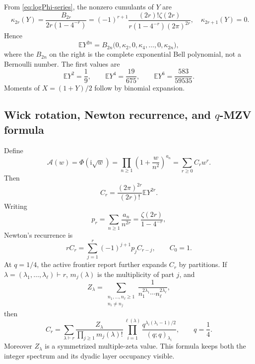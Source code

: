 \documentclass[11pt,oneside]{article}
\theoremstyle{definition}
\theoremstyle{remark}
\newcommand{\E}{\mathbb E}
\newcommand{\ii}{\mathrm i}
\newcommand{\Acal}{\mathcal A}
\begin{document}
From \eqref{eq:logPhi-series}, the nonzero cumulants of $Y$ are
\begin{equation}
 \boxed{\quad
 \kappa_{2r}(Y)
 =\frac{B_{2r}}{2r(1-4^{-r})}
 =(-1)^{r+1}\frac{(2r)!\zeta(2r)}
 {r(1-4^{-r})(2\pi)^{2r}},
 \quad \kappa_{2r+1}(Y)=0.
 \quad}                                                  \label{eq:Y-cumulants}
\end{equation}
Hence
\begin{equation}
 \E Y^{2n}=B_{2n}\bigl(0,\kappa_2,0,\kappa_4,\dots,0,\kappa_{2n}\bigr), \label{eq:Bell-moments}
\end{equation}
where the $B_{2n}$ on the right is the complete exponential Bell polynomial, not a Bernoulli
number.  The first values are
\begin{equation}
 \E Y^2=\frac19,\qquad
 \E Y^4=\frac{19}{675},\qquad
 \E Y^6=\frac{583}{59535}.                               \label{eq:first-moments}
\end{equation}
Moments of $X=(1+Y)/2$ follow by binomial expansion.

\subsection{Wick rotation, Newton recurrence, and \texorpdfstring{$q$}{q}-MZV formula}

Define
\begin{equation}
 \Acal(w)=\Phi(\ii\sqrt w)
 =\prod_{n\ge1}\left(1+\frac{w}{n^2}\right)^{a_n}
 =\sum_{r\ge0}C_rw^r.                                    \label{eq:A-def}
\end{equation}
Then
\begin{equation}
 C_r=\frac{(2\pi)^{2r}}{(2r)!}\E Y^{2r}.                 \label{eq:C-moment}
\end{equation}
Writing
\begin{equation}
 p_r=\sum_{n\ge1}\frac{a_n}{n^{2r}}
 =\frac{\zeta(2r)}{1-4^{-r}},                            \label{eq:pr}
\end{equation}
Newton's recurrence is
\begin{equation}
 rC_r=\sum_{j=1}^r(-1)^{j+1}p_jC_{r-j},\qquad C_0=1.    \label{eq:Newton-C}
\end{equation}
At $q=1/4$, the active frontier report further expands $C_r$ by partitions.  If
$\lambda=(\lambda_1,\dots,\lambda_\ell)\vdash r$, $m_j(\lambda)$ is the multiplicity of
part $j$, and
\begin{equation}
 Z_\lambda=\sum_{\substack{n_1,\dots,n_\ell\ge1\\n_i\ne n_j}}
 \frac{1}{n_1^{2\lambda_1}\cdots n_\ell^{2\lambda_\ell}},                \label{eq:Zlambda}
\end{equation}
then
\begin{equation}
 \boxed{\quad
 C_r=\sum_{\lambda\vdash r}
 \frac{Z_\lambda}{\prod_{j\ge1}m_j(\lambda)!}
 \prod_{i=1}^{\ell(\lambda)}
 \frac{q^{\lambda_i(\lambda_i-1)/2}}{(q;q)_{\lambda_i}},
 \qquad q=\frac14.
 \quad}                                                  \label{eq:q-MZV}
\end{equation}
Moreover $Z_\lambda$ is a symmetrized multiple-zeta value.  This formula keeps both the
integer spectrum and its dyadic layer occupancy visible.
\end{document}
